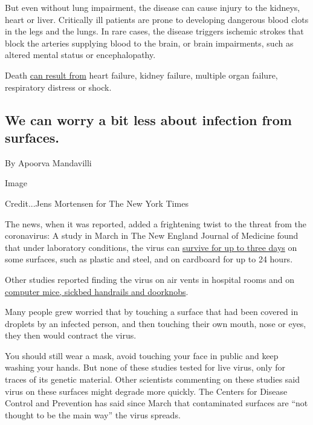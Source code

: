 But even without lung impairment, the disease can cause injury to the
kidneys, heart or liver. Critically ill patients are prone to developing
dangerous blood clots in the legs and the lungs. In rare cases, the
disease triggers ischemic strokes that block the arteries supplying
blood to the brain, or brain impairments, such as altered mental status
or encephalopathy.

Death
\href{https://www.thelancet.com/journals/lancet/article/PIIS0140-6736(20)30558-4/fulltext}{can
result from} heart failure, kidney failure, multiple organ failure,
respiratory distress or shock.

\hypertarget{we-can-worry-a-bit-less-about-infection-from-surfaces}{%
\subsection{We can worry a bit less about infection from
surfaces.}\label{we-can-worry-a-bit-less-about-infection-from-surfaces}}

By Apoorva Mandavilli

Image

Credit...Jens Mortensen for The New York Times

The news, when it was reported, added a frightening twist to the threat
from the coronavirus: A study in March in The New England Journal of
Medicine found that under laboratory conditions, the virus can
\href{https://www.nytimes3xbfgragh.onion/2020/03/17/health/coronavirus-surfaces-aerosols.html}{survive
for up to three days} on some surfaces, such as plastic and steel, and
on cardboard for up to 24 hours.

Other studies reported finding the virus on air vents in hospital rooms
and on
\href{https://wwwnc.cdc.gov/eid/article/26/7/20-0885_article}{computer
mice, sickbed handrails and doorknobs}.

Many people grew worried that by touching a surface that had been
covered in droplets by an infected person, and then touching their own
mouth, nose or eyes, they then would contract the virus.

You should still wear a mask, avoid touching your face in public and
keep washing your hands. But none of these studies tested for live
virus, only for traces of its genetic material. Other scientists
commenting on these studies said virus on these surfaces might degrade
more quickly. The Centers for Disease Control and Prevention has said
since March that contaminated surfaces are ``not thought to be the main
way'' the virus spreads.

